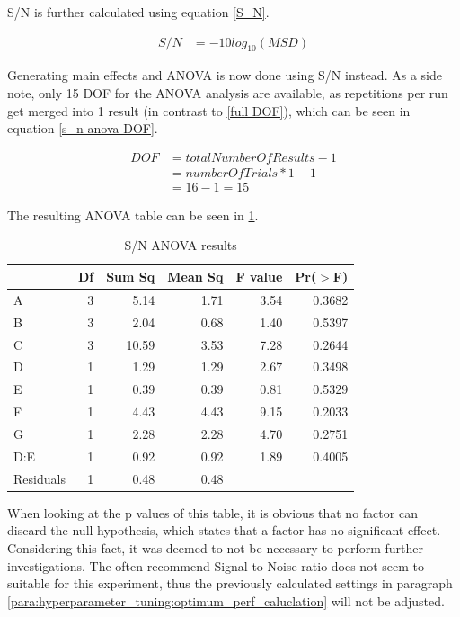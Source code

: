 S/N is further calculated using equation \ref{S_N}.

\begin{equation} \label{S_N}
	\begin{split}
		S/N & = -10 log_{10} (MSD)
	\end{split}
\end{equation}

Generating main effects and ANOVA is now done using S/N instead. As a side note, only 15 DOF for the ANOVA analysis are available, as repetitions per run get merged into 1 result (in contrast to \ref{full DOF}), which can be seen in equation \ref{s_n anova DOF}.

\begin{equation} \label{s_n anova DOF}
	\begin{split}
		DOF & = totalNumberOfResults - 1 \\
		& = numberOfTrials * 1 - 1 \\
		& = 16 - 1 = 15
	\end{split}
\end{equation}

The resulting ANOVA table can be seen in \ref{table:taguchi:s_n_anova_results}.

\begin{table}[ht]
	\centering
	\begin{tabular}{lrrrrr}
		\hline
		& Df & Sum Sq & Mean Sq & F value & Pr($>$F) \\ 
		\hline
		A & 3 & 5.14 & 1.71 & 3.54 & 0.3682 \\ 
		B & 3 & 2.04 & 0.68 & 1.40 & 0.5397 \\ 
		C & 3 & 10.59 & 3.53 & 7.28 & 0.2644 \\ 
		D & 1 & 1.29 & 1.29 & 2.67 & 0.3498 \\ 
		E & 1 & 0.39 & 0.39 & 0.81 & 0.5329 \\ 
		F & 1 & 4.43 & 4.43 & 9.15 & 0.2033 \\ 
		G & 1 & 2.28 & 2.28 & 4.70 & 0.2751 \\ 
		D:E & 1 & 0.92 & 0.92 & 1.89 & 0.4005 \\ 
		Residuals & 1 & 0.48 & 0.48 &  &  \\ 
		\hline
	\end{tabular}
		\caption{S/N ANOVA results}
	\label{table:taguchi:s_n_anova_results}
\end{table}

When looking at the p values of this table, it is obvious that no factor can discard the null-hypothesis, which states that a factor has no significant effect. Considering this fact, it was deemed to not be necessary to perform further investigations. The often recommend Signal to Noise ratio does not seem to suitable for this experiment, thus the previously calculated settings in paragraph \ref{para:hyperparameter_tuning:optimum_perf_caluclation} will not be adjusted.

